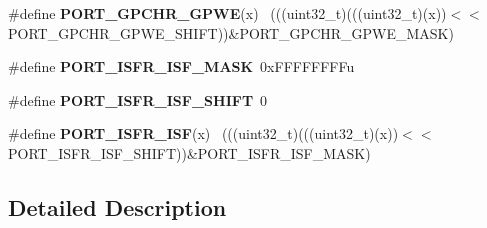 \begin{DoxyCompactItemize}
\item 
\hypertarget{group___p_o_r_t___register___masks_gae9cf8d5289e6249274584e60f984663b}{}\#define {\bfseries P\+O\+R\+T\+\_\+\+G\+P\+C\+H\+R\+\_\+\+G\+P\+W\+E}(x)                                          ~(((uint32\+\_\+t)(((uint32\+\_\+t)(x))$<$$<$P\+O\+R\+T\+\_\+\+G\+P\+C\+H\+R\+\_\+\+G\+P\+W\+E\+\_\+\+S\+H\+I\+F\+T))\&P\+O\+R\+T\+\_\+\+G\+P\+C\+H\+R\+\_\+\+G\+P\+W\+E\+\_\+\+M\+A\+S\+K)\label{group___p_o_r_t___register___masks_gae9cf8d5289e6249274584e60f984663b}

\item 
\hypertarget{group___p_o_r_t___register___masks_gabb5d188f3dfe38f0d8bbb870e81fb7e3}{}\#define {\bfseries P\+O\+R\+T\+\_\+\+I\+S\+F\+R\+\_\+\+I\+S\+F\+\_\+\+M\+A\+S\+K}~0x\+F\+F\+F\+F\+F\+F\+F\+Fu\label{group___p_o_r_t___register___masks_gabb5d188f3dfe38f0d8bbb870e81fb7e3}

\item 
\hypertarget{group___p_o_r_t___register___masks_ga678f290447622562272513d57eb2bf78}{}\#define {\bfseries P\+O\+R\+T\+\_\+\+I\+S\+F\+R\+\_\+\+I\+S\+F\+\_\+\+S\+H\+I\+F\+T}~0\label{group___p_o_r_t___register___masks_ga678f290447622562272513d57eb2bf78}

\item 
\hypertarget{group___p_o_r_t___register___masks_ga0cef94247261ca16ebf25b6f432f1344}{}\#define {\bfseries P\+O\+R\+T\+\_\+\+I\+S\+F\+R\+\_\+\+I\+S\+F}(x)                                              ~(((uint32\+\_\+t)(((uint32\+\_\+t)(x))$<$$<$P\+O\+R\+T\+\_\+\+I\+S\+F\+R\+\_\+\+I\+S\+F\+\_\+\+S\+H\+I\+F\+T))\&P\+O\+R\+T\+\_\+\+I\+S\+F\+R\+\_\+\+I\+S\+F\+\_\+\+M\+A\+S\+K)\label{group___p_o_r_t___register___masks_ga0cef94247261ca16ebf25b6f432f1344}

\end{DoxyCompactItemize}


\subsection{Detailed Description}
